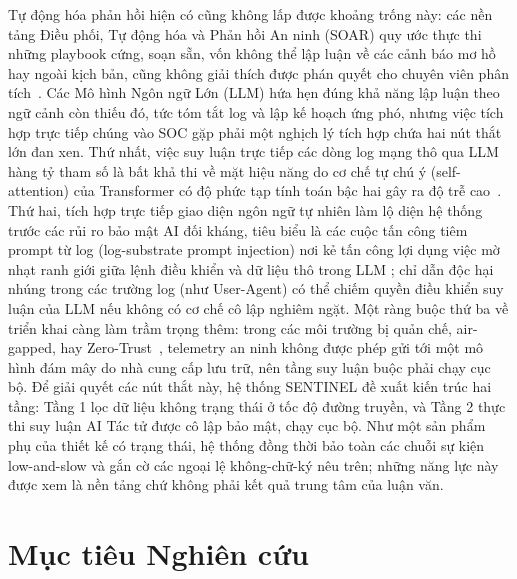 Tự động hóa phản hồi hiện có cũng không lấp được khoảng trống này: các nền tảng Điều phối, Tự động hóa và Phản hồi An ninh (SOAR) quy ước thực thi những playbook cứng, soạn sẵn, vốn không thể lập luận về các cảnh báo mơ hồ hay ngoài kịch bản, cũng không giải thích được phán quyết cho chuyên viên phân tích~\cite{soar2025}. Các Mô hình Ngôn ngữ Lớn (LLM) hứa hẹn đúng khả năng lập luận theo ngữ cảnh còn thiếu đó, tức tóm tắt log và lập kế hoạch ứng phó, nhưng việc tích hợp trực tiếp chúng vào SOC gặp phải một nghịch lý tích hợp chứa hai nút thắt lớn đan xen. Thứ nhất, việc suy luận trực tiếp các dòng log mạng thô qua LLM hàng tỷ tham số là bất khả thi về mặt hiệu năng do cơ chế tự chú ý (self-attention) của Transformer có độ phức tạp tính toán bậc hai gây ra độ trễ cao~\cite{vaswani2017}. Thứ hai, tích hợp trực tiếp giao diện ngôn ngữ tự nhiên làm lộ diện hệ thống trước các rủi ro bảo mật AI đối kháng, tiêu biểu là các cuộc tấn công tiêm prompt từ log (log-substrate prompt injection) nơi kẻ tấn công lợi dụng việc mờ nhạt ranh giới giữa lệnh điều khiển và dữ liệu thô trong LLM \cite{promptinjection2023}; chỉ dẫn độc hại nhúng trong các trường log (như User-Agent) có thể chiếm quyền điều khiển suy luận của LLM nếu không có cơ chế cô lập nghiêm ngặt. Một ràng buộc thứ ba về triển khai càng làm trầm trọng thêm: trong các môi trường bị quản chế, air-gapped, hay Zero-Trust~\cite{nist80207}, telemetry an ninh không được phép gửi tới một mô hình đám mây do nhà cung cấp lưu trữ, nên tầng suy luận buộc phải chạy cục bộ. Để giải quyết các nút thắt này, hệ thống SENTINEL đề xuất kiến trúc hai tầng: Tầng 1 lọc dữ liệu không trạng thái ở tốc độ đường truyền, và Tầng 2 thực thi suy luận AI Tác tử được cô lập bảo mật, chạy cục bộ. Như một sản phẩm phụ của thiết kế có trạng thái, hệ thống đồng thời bảo toàn các chuỗi sự kiện low-and-slow và gắn cờ các ngoại lệ không-chữ-ký nêu trên; những năng lực này được xem là nền tảng chứ không phải kết quả trung tâm của luận văn.

\section{Mục tiêu Nghiên cứu}

